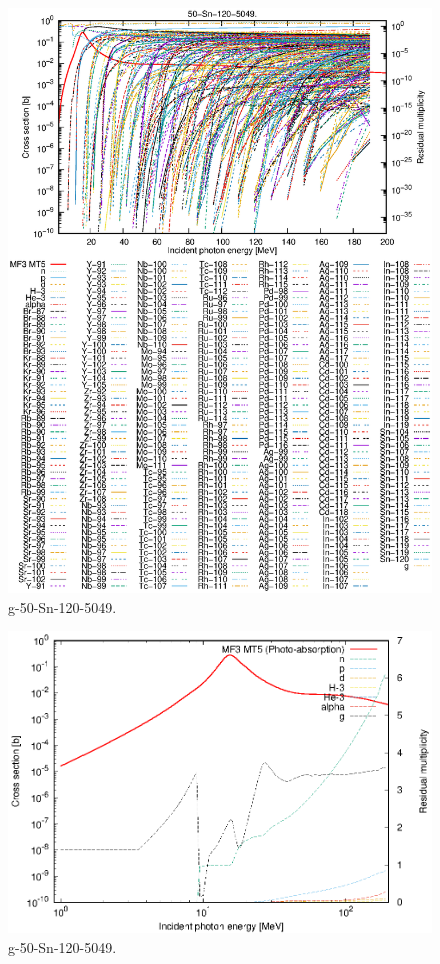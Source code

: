 \begin{figure}
 \includegraphics[width=\linewidth]{eps/g_50-Sn-120_5049.eps}
  \caption{g-50-Sn-120-5049.}
\end{figure}
\newpage \clearpage

\begin{figure}
 \includegraphics[width=\linewidth]{eps-log/g_50-Sn-120_5049.eps}
 \caption{g-50-Sn-120-5049.}
\end{figure}
\newpage \clearpage

